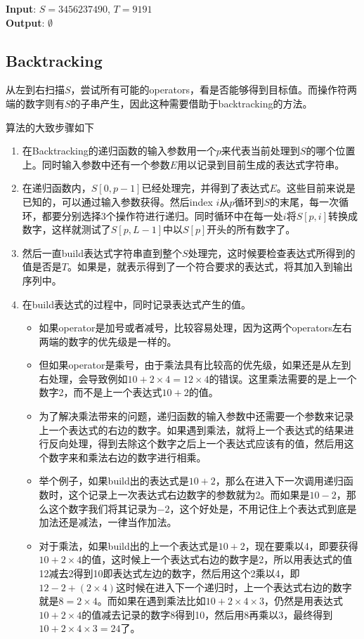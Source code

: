 \begin{flushleft}
\textbf{Input}: $S = 3456237490$, $T = 9191$
\\
\textbf{Output}: $\emptyset$
\end{flushleft}
\subsection{Backtracking}
从左到右扫描$S$，尝试所有可能的operators，看是否能够得到目标值。而操作符两端的数字则有$S$的子串产生，因此这种需要借助于backtracking的方法。
\par
算法的大致步骤如下
\begin{enumerate}
\item 在Backtracking的递归函数的输入参数用一个$p$来代表当前处理到$S$的哪个位置上。同时输入参数中还有一个参数$E$用以记录到目前生成的表达式字符串。
\item 在递归函数内，$S[0,p-1]$已经处理完，并得到了表达式$E$。这些目前来说是已知的，可以通过输入参数获得。然后index $i$从$p$循环到$S$的末尾，每一次循环，都要分别选择3个操作符进行递归。同时循环中在每一处$i$将$S[p,i]$转换成数字，这样就测试了$S[p, L-1]$中以$S[p]$开头的所有数字了。
\item 然后一直build表达式字符串直到整个$S$处理完，这时候要检查表达式所得到的值是否是$T$。如果是，就表示得到了一个符合要求的表达式，将其加入到输出序列中。
\item 在build表达式的过程中，同时记录表达式产生的值。
\begin{itemize}
\item 如果operator是加号或者减号，比较容易处理，因为这两个operators左右两端的数字的优先级是一样的。
\item 但如果operator是乘号，由于乘法具有比较高的优先级，如果还是从左到右处理，会导致例如$10+2\times4=12\times4$的错误。这里乘法需要的是上一个数字2，而不是上一个表达式$10+2$的值。
\item 为了解决乘法带来的问题，递归函数的输入参数中还需要一个参数来记录上一个表达式的右边的数字。如果遇到乘法，就将上一个表达式的结果进行反向处理，得到去除这个数字之后上一个表达式应该有的值，然后用这个数字来和乘法右边的数字进行相乘。
\item 举个例子，如果build出的表达式是$10+2$，那么在进入下一次调用递归函数时，这个记录上一次表达式右边数字的参数就为2。而如果是$10-2$，那么这个数字我们将其记录为$-2$，这个好处是，不用记住上个表达式到底是加法还是减法，一律当作加法。
\item 对于乘法，如果build出的上一个表达式是$10+2$，现在要乘以4，即要获得$10+2\times 4$的值，这时候上一个表达式右边的数字是2，所以用表达式的值12减去2得到10即表达式左边的数字，然后用这个2乘以4，即$12-2+(2\times 4)$这时候在进入下一个递归时，上一个表达式右边的数字就是$8=2\times 4$。而如果在遇到乘法比如$10+2\times4\times3$，仍然是用表达式$10+2\times4$的值减去记录的数字8得到10，然后用8再乘以3，最终得到$10+2\times4\times3=24$了。
\end{itemize}
\end{enumerate}

